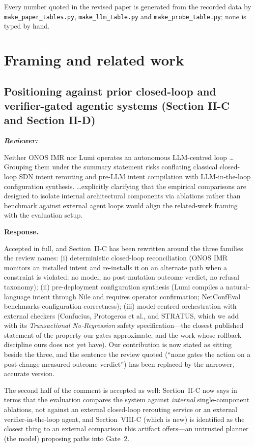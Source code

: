 \documentclass[11pt,a4paper]{article}
\newenvironment{reviewer}{\par\medskip\noindent\begin{minipage}{\linewidth}\small\itshape\color{quote}\textbf{Reviewer:}\par}{\end{minipage}\medskip\par}
\newenvironment{response}{\par\noindent\begin{minipage}{\linewidth}\small\textbf{Response.}\par}{\end{minipage}\medskip\par}
\begin{document}
\noindent Every number quoted in the revised paper is generated from the
recorded data by \texttt{make\_paper\_tables.py},
\texttt{make\_llm\_table.py} and \texttt{make\_probe\_table.py}; none is
typed by hand.

\section{Framing and related work}

\subsection{Positioning against prior closed-loop and verifier-gated agentic
systems (Section II-C and Section II-D)}

\begin{reviewer}
Neither ONOS IMR nor Lumi operates an autonomous LLM-centred loop \dots
Grouping them under the summary statement risks conflating classical
closed-loop SDN intent rerouting and pre-LLM intent compilation with
LLM-in-the-loop configuration synthesis. \dots explicitly clarifying that
the empirical comparisons are designed to isolate internal architectural
components via ablations rather than benchmark against external agent
loops would align the related-work framing with the evaluation setup.
\end{reviewer}

\begin{response}
Accepted in full, and Section~II-C has been rewritten around the three
families the review names: (i) deterministic closed-loop reconciliation
(ONOS IMR monitors an installed intent and re-installs it on an alternate
path when a constraint is violated; no model, no post-mutation outcome
verdict, no refusal taxonomy); (ii) pre-deployment configuration synthesis
(Lumi compiles a natural-language intent through Nile and requires
operator confirmation; NetConfEval benchmarks configuration correctness);
(iii) model-centred orchestration with external checkers (Confucius,
Protogeros et al., and STRATUS, which we add with its
\emph{Transactional No-Regression} safety specification---the closest
published statement of the property our gates approximate, and the work
whose rollback discipline ours does not yet have). Our contribution is now
stated as sitting beside the three, and the sentence the review quoted
(``none gates the action on a post-change measured outcome verdict'') has
been replaced by the narrower, accurate version.

The second half of the comment is accepted as well: Section~II-C now says
in terms that the evaluation compares the system against \emph{internal}
single-component ablations, not against an external closed-loop rerouting
service or an external verifier-in-the-loop agent, and Section~VIII-C
(which is new) is identified as the closest thing to an external
comparison this artifact offers---an untrusted planner (the model)
proposing paths into Gate~2.
\end{response}
\end{document}
